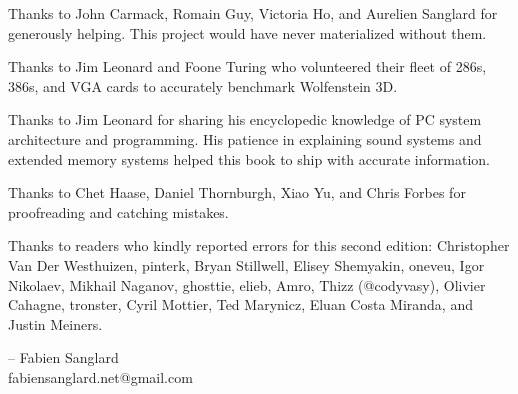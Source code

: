 Thanks to John Carmack, Romain Guy, Victoria Ho, and Aurelien Sanglard for generously helping. This project would have never
materialized without them.\\ 
\par
Thanks to  Jim Leonard and Foone Turing who volunteered their fleet of 286s, 386s, and VGA cards to accurately benchmark Wolfenstein 3D.\\
\par
Thanks to  Jim Leonard for sharing his encyclopedic knowledge of PC system architecture and programming. His patience in explaining sound systems and extended memory systems helped this book to ship with accurate information.\\
\par
Thanks to  Chet Haase, Daniel Thornburgh, Xiao Yu, and Chris Forbes for proofreading and catching mistakes.\\
\par
Thanks to readers who kindly reported errors for this second edition: Christopher Van Der Westhuizen, pinterk, Bryan Stillwell, Elisey Shemyakin, oneveu, Igor Nikolaev, Mikhail Naganov, ghosttie, elieb, Amro, Thizz (@codyvasy), Olivier Cahagne, tronster, Cyril Mottier, Ted Marynicz, 
Eluan Costa Miranda, and Justin Meiners.\\
\par
-- Fabien Sanglard\\
fabiensanglard.net@gmail.com
